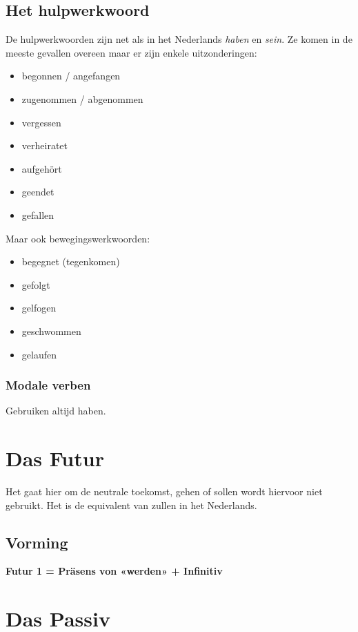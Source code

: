 \documentclass[main.tex]{subfiles}
\begin{document}
\subsection{Het hulpwerkwoord}
De hulpwerkwoorden zijn net als in het Nederlands \textit{haben} en \textit{sein}.
Ze komen in de meeste gevallen overeen maar er zijn enkele uitzonderingen:
\begin{itemize}
\item begonnen / angefangen
\item zugenommen / abgenommen
\item vergessen
\item verheiratet
\item aufgehört
\item geendet
\item gefallen
\end{itemize}
Maar ook bewegingswerkwoorden:
\begin{itemize}
\item begegnet (tegenkomen)
\item gefolgt
\item gelfogen
\item geschwommen
\item gelaufen
\end{itemize}
\subsubsection{Modale verben}
Gebruiken altijd haben.
\section{Das Futur}
Het gaat hier om de neutrale toekomst, gehen of sollen wordt hiervoor niet gebruikt. Het is de equivalent van zullen in het Nederlands.
\subsection{Vorming}
\textbf{Futur 1 = Präsens von «werden» + Infinitiv}
\section{Das Passiv}
\end{document}
